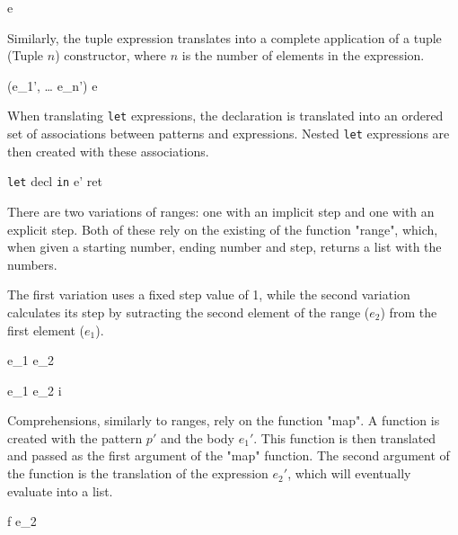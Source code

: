 \documentclass[class=article, crop=false]{standalone}
\begin{document}
  {\gamma \vdash [e_1', \; \dots \; e_n'] \Rightarrow e}

\bigskip

Similarly, the tuple expression translates into a complete application of a tuple (Tuple $n$) constructor, where $n$ is the number of elements in the expression.

  {\gamma \vdash (e_1', \; \dots \; e_n') \Rightarrow e}

\bigskip

When translating \texttt{let} expressions, the declaration is translated into an ordered set of associations between patterns and expressions.
Nested \texttt{let} expressions are then created with these associations.

  {\gamma \vdash \texttt{let} \; decl\; \texttt{in} \; e' \Rightarrow ret}

\bigskip

There are two variations of ranges: one with an implicit step and one with an explicit step.
Both of these rely on the existing of the function "range", which, when given a starting number, ending number and step, returns a list with the numbers.

The first variation uses a fixed step value of 1, while the second variation calculates its step by sutracting the second element of the range ($e_2$) from the first element ($e_1$).

  {\gamma \vdash [e_1' \; .. \; e_2'] \Rightarrow {} \; e_1 \; e_2 }

  {\gamma \vdash [e_1', \; e_2' \; .. \; e_3'] \Rightarrow {} \; e_1 \; e_2 \; i}

\bigskip

Comprehensions, similarly to ranges, rely on the function "map".
A function is created with the pattern $p'$ and the body $e_1'$.
This function is then translated and passed as the first argument of the "map" function.
The second argument of the function is the translation of the expression $e_2'$, which will eventually evaluate into a list.

  {\gamma {} \Rightarrow {} \; f \; e_2}
\end{document}
